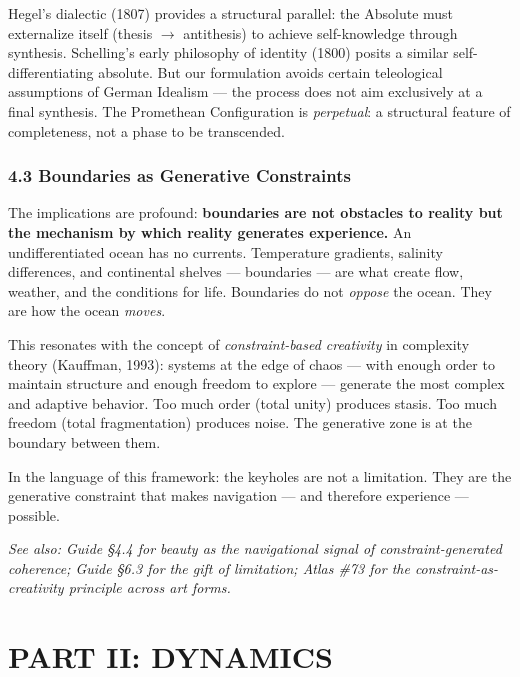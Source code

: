 Hegel's dialectic (1807) provides a structural parallel: the Absolute must externalize itself (thesis $\rightarrow$ antithesis) to achieve self-knowledge through synthesis. Schelling's early philosophy of identity (1800) posits a similar self-differentiating absolute. But our formulation avoids certain teleological assumptions of German Idealism — the process does not aim exclusively at a final synthesis. The Promethean Configuration is \textit{perpetual}: a structural feature of completeness, not a phase to be transcended.


\subsection*{4.3 Boundaries as Generative Constraints}


The implications are profound: \textbf{boundaries are not obstacles to reality but the mechanism by which reality generates experience.} An undifferentiated ocean has no currents. Temperature gradients, salinity differences, and continental shelves — boundaries — are what create flow, weather, and the conditions for life. Boundaries do not \textit{oppose} the ocean. They are how the ocean \textit{moves}.


This resonates with the concept of \textit{constraint-based creativity} in complexity theory (Kauffman, 1993): systems at the edge of chaos — with enough order to maintain structure and enough freedom to explore — generate the most complex and adaptive behavior. Too much order (total unity) produces stasis. Too much freedom (total fragmentation) produces noise. The generative zone is at the boundary between them.


In the language of this framework: the keyholes are not a limitation. They are the generative constraint that makes navigation — and therefore experience — possible.


\textit{See also: Guide §4.4 for beauty as the navigational signal of constraint-generated coherence; Guide §6.3 for the gift of limitation; Atlas \#73 for the constraint-as-creativity principle across art forms.}


\bigskip\noindent\makebox[\textwidth]{\color{rulegray}\rule{5cm}{0.3pt}}\bigskip


\chapter*{PART II: DYNAMICS}


